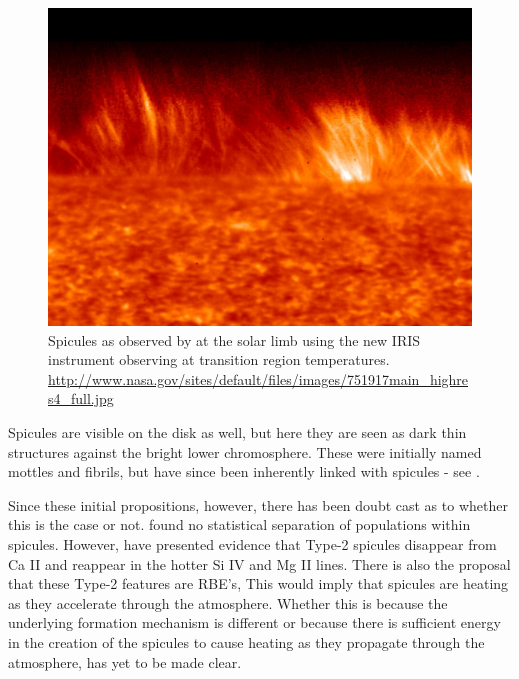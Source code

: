 \begin{figure}
	\centering
	\includegraphics[scale=0.4]{Chapter2/Figs/spicules_at_limb}
	\caption{Spicules as observed by at the solar limb using the new IRIS instrument observing at transition region temperatures.
		\url{http://www.nasa.gov/sites/default/files/images/751917main_highres4_full.jpg}}
\end{figure}

Spicules are visible on the disk as well, but here they are seen as dark thin structures against the bright lower chromosphere.
These were initially named mottles and fibrils, but have since been inherently linked with spicules - see \cite{DePontieu2007MF, Rouppe2009}.

Since these initial propositions, however, there has been doubt cast as to whether this is the case or not. 
\cite{Zhang2012} found no statistical separation of populations within spicules.
However, \cite{Pereira2014} have presented evidence that Type-2 spicules disappear from Ca II and reappear in the hotter Si IV and Mg II lines.
There is also the proposal that these Type-2 features are RBE's, \cite{Kurdize2015, Rouppe2015}
This would imply that spicules are heating as they accelerate through the atmosphere.
Whether this is because the underlying formation mechanism is different or because there is sufficient energy in the creation of the spicules to cause heating as they propagate through the atmosphere, has yet to be made clear. 

